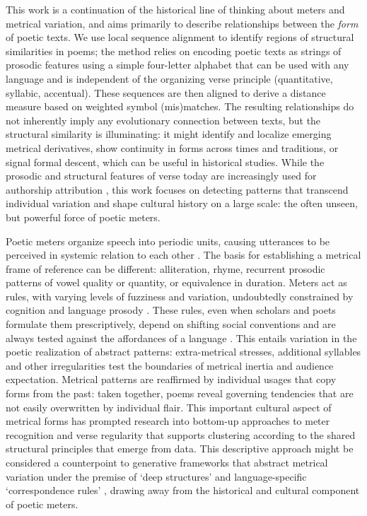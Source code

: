 \documentclass[
    hf
]{ceurart}
\begin{document}
This work is a continuation of the historical line of thinking about meters and metrical variation, and aims primarily to describe relationships between the \textit{form} of poetic texts. We use local sequence alignment to identify regions of structural similarities in poems; the method relies on encoding poetic texts as strings of prosodic features using a simple four-letter alphabet that can be used with any language and is independent of the organizing verse principle (quantitative, syllabic, accentual). These sequences are then aligned to derive a distance measure based on weighted symbol (mis)matches. The resulting relationships do not inherently imply any evolutionary connection between texts, but the structural similarity is illuminating: it might identify and localize emerging metrical derivatives, show continuity in forms across times and traditions, or signal formal descent, which can be useful in historical studies. While the prosodic and structural features of verse today are increasingly used for authorship attribution \cite{nagy_metre_2021, plechac_versification_2021}, this work focuses on detecting patterns that transcend individual variation and shape cultural history on a large scale: the often unseen, but powerful force of poetic meters.

Poetic meters organize speech into periodic units, causing utterances to be perceived in systemic relation to each other \cite{frog_metrical_2021}. The basis for establishing a metrical frame of reference can be different: alliteration, rhyme, recurrent prosodic patterns of vowel quality or quantity, or equivalence in duration. Meters act as rules, with varying levels of fuzziness and variation, undoubtedly constrained by cognition and language prosody \cite{rubin_memory_1995,decastro-arrazola_testing_2018,decastro-arrazola_typological_2018}. These rules, even when scholars and poets formulate them prescriptively, depend on shifting social conventions and are always tested against the affordances of a language \cite{shapir_metrum_2000}. This entails variation in the poetic realization of abstract patterns: extra-metrical stresses, additional syllables and other irregularities test the boundaries of metrical inertia and audience expectation. Metrical patterns are reaffirmed by individual usages that copy forms from the past: taken together, poems reveal governing tendencies that are not easily overwritten by individual flair. This important cultural aspect of metrical forms has prompted research into bottom-up approaches to meter recognition and verse regularity \cite{porter_space_2018, sela_measuring_2022,plechac_rhythm-based_2023} that supports clustering according to the shared structural principles that emerge from data. This descriptive approach might be considered a counterpoint to generative frameworks that abstract metrical variation under the premise of `deep structures' and language-specific `correspondence rules' \cite{fabb_meter_2008}, drawing away from the historical and cultural component of poetic meters.
\end{document}
